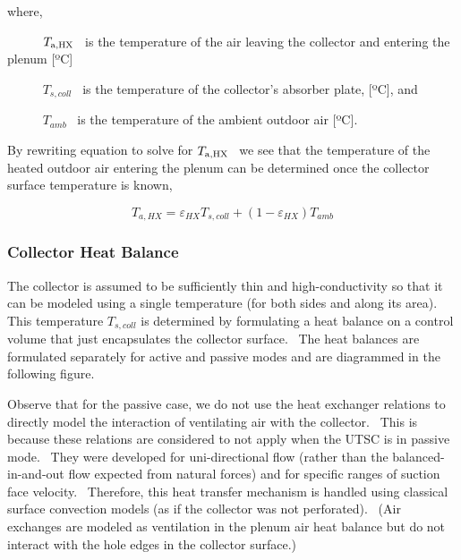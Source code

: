 where,

~~~~~ \({T_{{\rm{a,HX}}}}\) ~is the temperature of the air leaving the collector and entering the plenum {[}ºC{]}

~~~~~ \({T_{s,coll}}\) ~is the temperature of the collector's absorber plate, {[}ºC{]}, and

~~~~~ \({T_{amb}}\) ~is the temperature of the ambient outdoor air {[}ºC{]}.

By rewriting equation to solve for \({T_{{\rm{a,HX}}}}\) ~we see that the temperature of the heated outdoor air entering the plenum can be determined once the collector surface temperature is known,

\begin{equation}
{T_{a,HX}} = {\varepsilon_{HX}}{T_{s,coll}} + \left( {1 - {\varepsilon_{HX}}} \right){T_{amb}}
\end{equation}

\subsubsection{Collector Heat Balance}\label{collector-heat-balance}

The collector is assumed to be sufficiently thin and high-conductivity so that it can be modeled using a single temperature (for both sides and along its area).~ This temperature \({T_{s,coll}}\) is determined by formulating a heat balance on a control volume that just encapsulates the collector surface.~ The heat balances are formulated separately for active and passive modes and are diagrammed in the following figure.

Observe that for the passive case, we do not use the heat exchanger relations to directly model the interaction of ventilating air with the collector.~ This is because these relations are considered to not apply when the UTSC is in passive mode.~ They were developed for uni-directional flow (rather than the balanced-in-and-out flow expected from natural forces) and for specific ranges of suction face velocity.~ Therefore, this heat transfer mechanism is handled using classical surface convection models (as if the collector was not perforated).~ (Air exchanges are modeled as ventilation in the plenum air heat balance but do not interact with the hole edges in the collector surface.)

